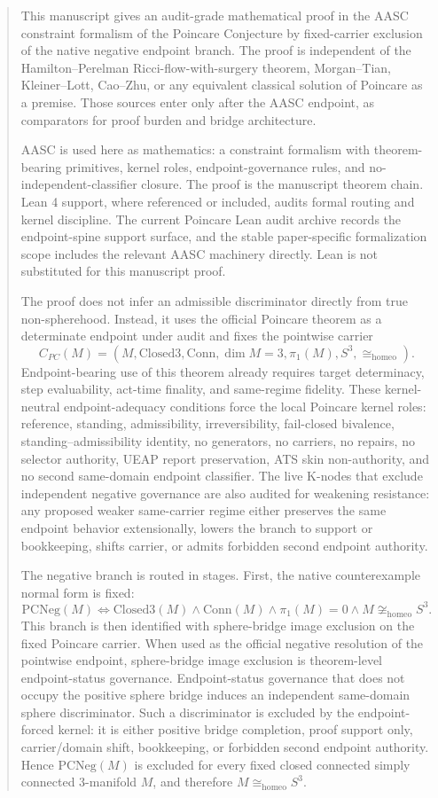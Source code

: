 \documentclass[11pt]{article}
\newcommand{\Sthree}{S^{3}}
\newcommand{\ClosedThree}{\mathrm{Closed3}}
\newcommand{\Conn}{\mathrm{Conn}}
\newcommand{\CarrierPC}{C_{PC}}
\newcommand{\PCNeg}{\mathrm{PCNeg}}
\newcommand{\Homeo}{\cong_{\mathrm{homeo}}}
\begin{document}
\begin{abstract}
This manuscript gives an audit-grade mathematical proof in the AASC constraint formalism of the Poincare Conjecture by fixed-carrier exclusion of the native negative endpoint branch. The proof is independent of the Hamilton--Perelman Ricci-flow-with-surgery theorem, Morgan--Tian, Kleiner--Lott, Cao--Zhu, or any equivalent classical solution of Poincare as a premise. Those sources enter only after the AASC endpoint, as comparators for proof burden and bridge architecture.

AASC is used here as mathematics: a constraint formalism with theorem-bearing primitives, kernel roles, endpoint-governance rules, and no-independent-classifier closure. The proof is the manuscript theorem chain. Lean 4 support, where referenced or included, audits formal routing and kernel discipline. The current Poincare Lean audit archive records the endpoint-spine support surface, and the stable paper-specific formalization scope includes the relevant AASC machinery directly. Lean is not substituted for this manuscript proof.

The proof does not infer an admissible discriminator directly from true non-spherehood. Instead, it uses the official Poincare theorem as a determinate endpoint under audit and fixes the pointwise carrier
\[
\CarrierPC(M)=(M,\ClosedThree,\Conn,\dim M=3,\pi_1(M),\Sthree,\Homeo).
\]
Endpoint-bearing use of this theorem already requires target determinacy, step evaluability, act-time finality, and same-regime fidelity. These kernel-neutral endpoint-adequacy conditions force the local Poincare kernel roles: reference, standing, admissibility, irreversibility, fail-closed bivalence, standing--admissibility identity, no generators, no carriers, no repairs, no selector authority, UEAP report preservation, ATS skin non-authority, and no second same-domain endpoint classifier. The live K-nodes that exclude independent negative governance are also audited for weakening resistance: any proposed weaker same-carrier regime either preserves the same endpoint behavior extensionally, lowers the branch to support or bookkeeping, shifts carrier, or admits forbidden second endpoint authority.

The negative branch is routed in stages. First, the native counterexample normal form is fixed:
\[
\PCNeg(M)\Longleftrightarrow \ClosedThree(M)\wedge \Conn(M)\wedge \pi_1(M)=0\wedge M\not\Homeo\Sthree.
\]
This branch is then identified with sphere-bridge image exclusion on the fixed Poincare carrier. When used as the official negative resolution of the pointwise endpoint, sphere-bridge image exclusion is theorem-level endpoint-status governance. Endpoint-status governance that does not occupy the positive sphere bridge induces an independent same-domain sphere discriminator. Such a discriminator is excluded by the endpoint-forced kernel: it is either positive bridge completion, proof support only, carrier/domain shift, bookkeeping, or forbidden second endpoint authority. Hence \(\PCNeg(M)\) is excluded for every fixed closed connected simply connected 3-manifold \(M\), and therefore \(M\Homeo\Sthree\).
\end{abstract}
\end{document}
